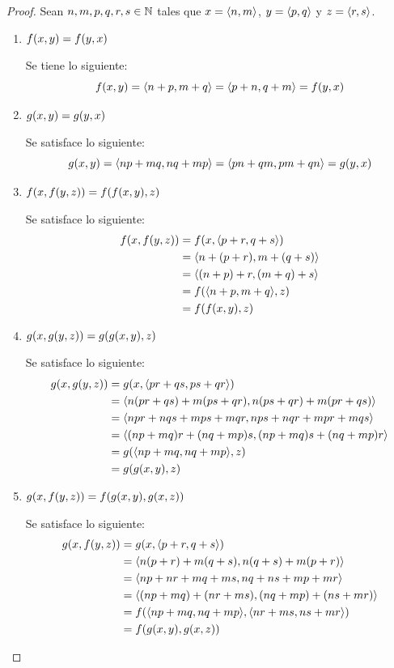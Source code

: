 \begin{proof}
	Sean $n, m, p, q, r, s\in\NN$ tales que $x =\inner*{n, m}$, $y =\inner*{p, q}$ y $z =\inner*{r, s}$.

	\begin{enumerate}
		\item $f\pa*{x, y} = f\pa*{y, x}$

		Se tiene lo siguiente:
		\[
			f\pa*{x, y} =\inner*{n + p, m + q} =\inner*{p + n, q + m} = f\pa*{y, x}
		\]
		\item $g\pa*{x, y} = g\pa*{y, x}$

		Se satisface lo siguiente:
		\[
			g\pa*{x, y} =\inner*{np + mq, nq + mp} =\inner*{pn + qm, pm + qn} = g\pa*{y, x}
		\]
		\item $f\pa*{x, f\pa*{y, z}} = f\pa*{f\pa*{x, y}, z}$

		Se satisface lo siguiente:
		\begin{align*}
			f\pa*{x, f\pa*{y, z}} &= f\pa*{x,\inner*{p + r, q + s}}\\
			&=\inner*{n +\pa*{p + r}, m +\pa*{q + s}}\\
			&=\inner*{\pa*{n + p} + r,\pa*{m + q} + s}\\
			&= f\pa*{\inner*{n + p, m + q}, z}\\
			&= f\pa*{f\pa*{x, y}, z}
		\end{align*}
		\item $g\pa*{x, g\pa*{y, z}} = g\pa*{g\pa*{x, y}, z}$

		Se satisface lo siguiente:
		\begin{align*}
			g\pa*{x, g\pa*{y, z}} &= g\pa*{x,\inner*{pr + qs, ps + qr}}\\
			&=\inner*{n\pa*{pr + qs} + m\pa*{ps + qr}, n\pa*{ps + qr} + m\pa*{pr + qs}}\\
			&=\inner*{npr + nqs + mps + mqr, nps + nqr + mpr + mqs}\\
			&=\inner*{\pa*{np + mq}r +\pa*{nq + mp}s,\pa*{np + mq}s +\pa*{nq + mp}r}\\
			&= g\pa*{\inner*{np + mq, nq + mp}, z}\\
			&= g\pa*{g\pa*{x, y}, z}
		\end{align*}
		\item $g\pa*{x, f\pa*{y, z}} = f\pa*{g\pa*{x, y}, g\pa*{x, z}}$

		Se satisface lo siguiente:
		\begin{align*}
			g\pa*{x, f\pa*{y, z}} &= g\pa*{x,\inner*{p + r, q + s}}\\
			&=\inner*{n\pa*{p + r} + m\pa*{q + s}, n\pa*{q + s} + m\pa*{p + r}}\\
			&=\inner*{np + nr + mq + ms, nq + ns + mp + mr}\\
			&=\inner*{\pa*{np + mq} +\pa*{nr + ms},\pa*{nq + mp} +\pa*{ns + mr}}\\
			&= f\pa*{\inner*{np + mq, nq + mp},\inner*{nr + ms, ns + mr}}\\
			&= f\pa*{g\pa*{x, y}, g\pa*{x, z}}
		\end{align*}
	\end{enumerate}
\end{proof}

